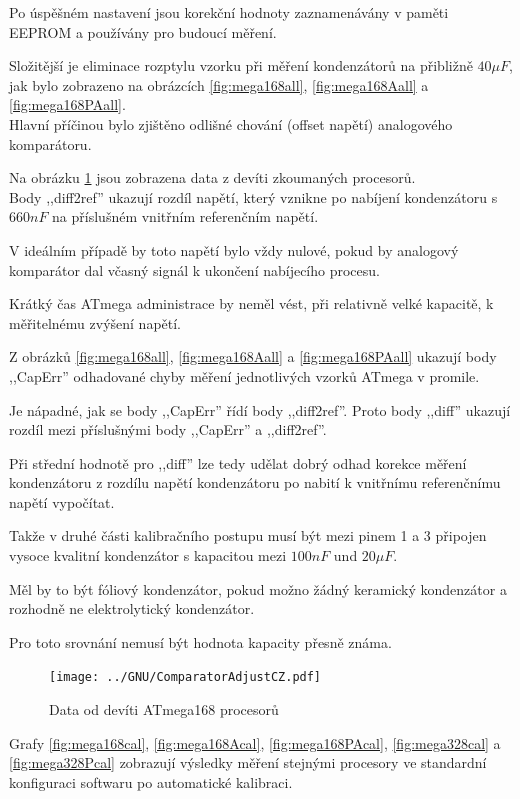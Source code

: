 Po úspěšném nastavení jsou korekční hodnoty zaznamenávány v paměti EEPROM a používány pro budoucí měření.

Složitější je eliminace rozptylu vzorku při měření kondenzátorů na přibližně \(40\mu F\), jak bylo zobrazeno na obrázcích \ref{fig:mega168all}, \ref{fig:mega168Aall} a \ref{fig:mega168PAall}.\\
Hlavní příčinou bylo zjištěno odlišné chování (offset napětí) analogového komparátoru.

Na obrázku \ref{fig:CompAdjust} jsou zobrazena data z devíti zkoumaných procesorů.\\
Body ,,diff2ref'' ukazují rozdíl napětí, který vznikne po nabíjení kondenzátoru s \(660nF\) na
příslušném vnitřním referenčním napětí.

V ideálním případě by toto napětí bylo vždy nulové, pokud by analogový komparátor dal včasný signál k ukončení nabíjecího procesu.

Krátký čas  ATmega administrace by neměl vést, při relativně velké kapacitě, k měřitelnému zvýšení napětí.

Z obrázků \ref{fig:mega168all}, \ref{fig:mega168Aall} a \ref{fig:mega168PAall} ukazují body ,,CapErr'' 
odhadované chyby měření jednotlivých vzorků ATmega v promile.

Je nápadné, jak se body ,,CapErr'' řídí body ,,diff2ref''.
Proto body ,,diff''  ukazují rozdíl mezi příslušnými body ,,CapErr'' a ,,diff2ref''.

Při střední hodnotě pro ,,diff'' lze tedy udělat dobrý odhad korekce měření kondenzátoru z rozdílu napětí kondenzátoru po nabití k vnitřnímu referenčnímu napětí vypočítat.

Takže v druhé části kalibračního postupu musí být mezi pinem 1 a 3 připojen vysoce kvalitní kondenzátor
s kapacitou mezi \(100nF\) und \(20\mu F\).
 
Měl by to být fóliový kondenzátor, pokud možno žádný keramický kondenzátor a rozhodně ne
elektrolytický kondenzátor.

Pro toto srovnání nemusí být hodnota kapacity  přesně známa.

\begin{figure}[H]
\centering
\texttt{[image: ../GNU/ComparatorAdjustCZ.pdf]}
\caption{Data od devíti ATmega168 procesorů}
\label{fig:CompAdjust}
\end{figure}

Grafy \ref{fig:mega168cal}, \ref{fig:mega168Acal}, \ref{fig:mega168PAcal},  \ref{fig:mega328cal} a
\ref{fig:mega328Pcal} zobrazují výsledky měření stejnými procesory ve standardní konfiguraci softwaru po automatické kalibraci.

